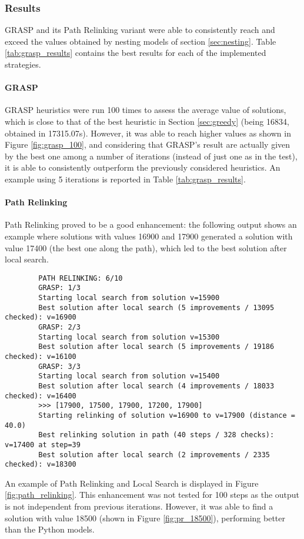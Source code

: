 \subsubsection{Results}
GRASP and its Path Relinking variant were able to consistently reach and exceed the values obtained by nesting models of section \ref{sec:nesting}. Table \ref{tab:grasp_results} contains the best results for each of the implemented strategies.

\paragraph{GRASP} GRASP heuristics were run 100 times to assess the average value of solutions, which is close to that of the best heuristic in Section \ref{sec:greedy} (being 16834, obtained in 17315.07s). However, it was able to reach higher values as shown in Figure \ref{fig:grasp_100}, and considering that GRASP's result are actually given by the best one among a number of iterations (instead of just one as in the test), it is able to consistently outperform the previously considered heuristics. An example using 5 iterations is reported in Table \ref{tab:grasp_results}.

\paragraph{Path Relinking} Path Relinking proved to be a good enhancement: the following output shows an example where solutions with values 16900 and 17900 generated a solution with value 17400 (the best one along the path), which led to the best solution after local search.

\begin{footnotesize}
	\begin{verbatim}
		PATH RELINKING: 6/10
		GRASP: 1/3
		Starting local search from solution v=15900
		Best solution after local search (5 improvements / 13095 checked): v=16900
		GRASP: 2/3
		Starting local search from solution v=15300
		Best solution after local search (5 improvements / 19186 checked): v=16100
		GRASP: 3/3
		Starting local search from solution v=15400
		Best solution after local search (4 improvements / 18033 checked): v=16400
		>>> [17900, 17500, 17900, 17200, 17900]
		Starting relinking of solution v=16900 to v=17900 (distance = 40.0)
		Best relinking solution in path (40 steps / 328 checks): v=17400 at step=39
		Best solution after local search (2 improvements / 2335 checked): v=18300
	\end{verbatim}
\end{footnotesize}
An example of Path Relinking and Local Search is displayed in Figure \ref{fig:path_relinking}. This enhancement was not tested for 100 steps as the output is not independent from previous iterations. However, it was able to find a solution with value 18500 (shown in Figure \ref{fig:pr_18500}), performing better than the Python models. 

